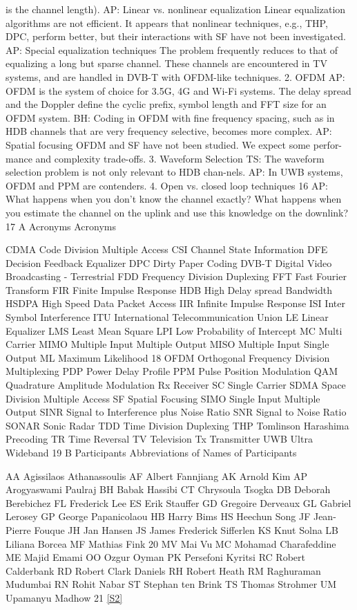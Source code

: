 \documentclass[11pt]{article}
\newcommand{\sref}[2]{\hyperlink{source:#1:#2}{[S#2]}}
\begin{document}
is the channel length). AP: Linear vs. nonlinear equalization Linear equalization algorithms are not efficient. It appears that nonlinear techniques, e.g., THP, DPC, perform better, but their interactions with SF have not been investigated. AP: Special equalization techniques The problem frequently reduces to that of equalizing a long but sparse channel. These channels are encountered in TV systems, and are handled in DVB-T with OFDM-like techniques. 2. OFDM AP: OFDM is the system of choice for 3.5G, 4G and Wi-Fi systems. The delay spread and the Doppler define the cyclic prefix, symbol length and FFT size for an OFDM system. BH: Coding in OFDM with fine frequency spacing, such as in HDB channels that are very frequency selective, becomes more complex. AP: Spatial focusing OFDM and SF have not been studied. We expect some perfor-mance and complexity trade-offs. 3. Waveform Selection TS: The waveform selection problem is not only relevant to HDB chan-nels. AP: In UWB systems, OFDM and PPM are contenders. 4. Open vs. closed loop techniques 16 AP: What happens when you don't know the channel exactly? What happens when you estimate the channel on the uplink and use this knowledge on the downlink? 17 A Acronyms Acronyms

CDMA Code Division Multiple Access CSI Channel State Information DFE Decision Feedback Equalizer DPC Dirty Paper Coding DVB-T Digital Video Broadcasting - Terrestrial FDD Frequency Division Duplexing FFT Fast Fourier Transform FIR Finite Impulse Response HDB High Delay spread Bandwidth HSDPA High Speed Data Packet Access IIR Infinite Impulse Response ISI Inter Symbol Interference ITU International Telecommunication Union LE Linear Equalizer LMS Least Mean Square LPI Low Probability of Intercept MC Multi Carrier MIMO Multiple Input Multiple Output MISO Multiple Input Single Output ML Maximum Likelihood 18 OFDM Orthogonal Frequency Division Multiplexing PDP Power Delay Profile PPM Pulse Position Modulation QAM Quadrature Amplitude Modulation Rx Receiver SC Single Carrier SDMA Space Division Multiple Access SF Spatial Focusing SIMO Single Input Multiple Output SINR Signal to Interference plus Noise Ratio SNR Signal to Noise Ratio SONAR Sonic Radar TDD Time Division Duplexing THP Tomlinson Harashima Precoding TR Time Reversal TV Television Tx Transmitter UWB Ultra Wideband 19 B Participants Abbreviations of Names of Participants

AA Agissilaos Athanassoulis AF Albert Fannjiang AK Arnold Kim AP Arogyaswami Paulraj BH Babak Hassibi CT Chrysoula Tsogka DB Deborah Berebichez FL Frederick Lee ES Erik Stauffer GD Gregoire Derveaux GL Gabriel Lerosey GP George Papanicolaou HB Harry Bims HS Heechun Song JF Jean-Pierre Fouque JH Jan Hansen JS James Frederick Sifferlen KS Knut Solna LB Liliana Borcea MF Mathias Fink 20 MV Mai Vu MC Mohamad Charafeddine ME Majid Emami OO Ozgur Oyman PK Persefoni Kyritsi RC Robert Calderbank RD Robert Clark Daniels RH Robert Heath RM Raghuraman Mudumbai RN Rohit Nabar ST Stephan ten Brink TS Thomas Strohmer UM Upamanyu Madhow 21 \sref{statement}{2}
\end{document}
